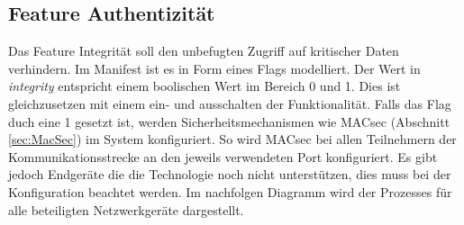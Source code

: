 \newpage
\subsection{Feature Authentizität}
Das Feature Integrität soll den unbefugten Zugriff auf kritischer Daten verhindern. Im Manifest ist es in Form eines Flags modelliert. Der Wert in \emph{integrity} entspricht einem boolischen Wert im Bereich 0 und 1. Dies ist gleichzusetzen mit einem ein- und ausschalten der Funktionalität. Falls das Flag duch eine 1 gesetzt ist, werden Sicherheitsmechanismen wie \ac{MACsec} (Abschnitt \ref{sec:MacSec}) im System konfiguriert. So wird \ac{MACsec} bei allen Teilnehmern der Kommunikationsstrecke an den jeweils verwendeten Port konfiguriert. Es gibt jedoch Endgeräte die die Technologie noch nicht unterstützen, dies muss bei der Konfiguration beachtet werden. Im nachfolgen Diagramm wird der Prozesses für alle beteiligten Netzwerkgeräte dargestellt.
